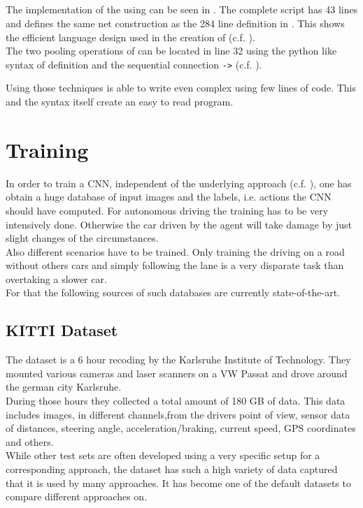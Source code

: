 \subsection{\cnnarch} \label{subsec: CNNArch Implementation}

The implementation of the \alexnet using \cnnarch can be seen in . The complete script has 43 lines and defines the same net construction as the 284 line definition in \caffe. This shows the efficient language design used in the creation of \cnnarch (c.f. ). \\
The two pooling operations of  can be located in line 32 using the python like syntax of definition and the sequential connection \texttt{->} (c.f. ).

Using those techniques \cnnarch is able to write even complex \nn using few lines of code. This and the syntax itself create an easy to read program.

\section{Training}

In order to train a CNN, independent of the underlying approach (c.f. ), one has obtain a huge database of input images and the labels, i.e. actions the CNN should have computed. For autonomous driving the training has to be very intensively done. Otherwise the car driven by the agent will take damage by just slight changes of the circumstances.\\
Also different scenarios have to be trained. Only training the driving on a road without others cars and simply following the lane is a very disparate task than overtaking a slower car.\\ %
For that the following sources of such databases are currently state-of-the-art.

\subsection{KITTI Dataset} \label{subsec: KITTI}

The \kitti dataset is a 6 hour recoding by the Karlsruhe Institute of Technology. They mounted various cameras and laser scanners on a VW Passat and drove around the german city Karlsruhe.\\
During those hours they collected a total amount of 180 GB of data. This data includes images, in different channels,from the drivers point of view, sensor data of distances, steering angle, acceleration/braking, current speed, GPS coordinates and others. \\
While other test sets are often developed using a very specific setup for a corresponding approach, the \kitti dataset has such a high variety of data captured that it is used by many approaches. It has become one of the default datasets to compare different approaches on. \cite{KITTI}

